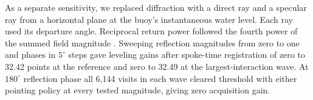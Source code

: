 As a separate sensitivity, we replaced diffraction with a direct ray and a specular ray from a horizontal plane at the buoy's instantaneous water level. Each ray used its departure angle. Reciprocal return power followed the fourth power of the summed field magnitude \cite{Galati2020Multipath}. Sweeping reflection magnitudes from zero to one and phases in $5^\circ$ steps gave leveling gains after spoke-time registration of zero to 32.42 points at the reference and zero to 32.49 at the largest-interaction wave. At $180^\circ$ reflection phase all 6,144 visits in each wave cleared threshold with either pointing policy at every tested magnitude, giving zero acquisition gain.
